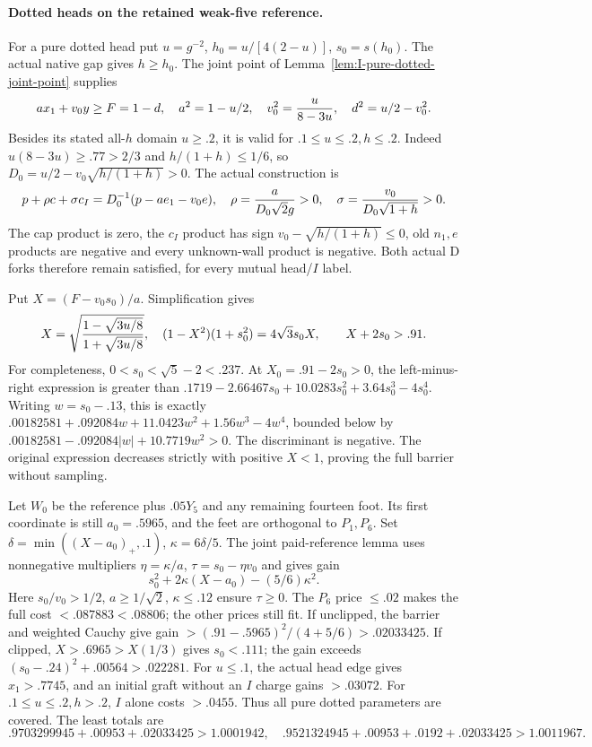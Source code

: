 \documentclass[11pt]{article}
\theoremstyle{definition}
\theoremstyle{remark}
\begin{document}
\paragraph{Dotted heads on the retained weak-five reference.}
For a pure dotted head put \(u=g^{-2}\), \(h_0=u/[4(2-u)]\),
\(s_0=s(h_0)\). The actual native gap gives \(h\ge h_0\). The
joint point of Lemma~\ref{lem:I-pure-dotted-joint-point} supplies
\[
 ax_1+v_0y\ge F=1-d,\quad a^2=1-u/2,\quad
 v_0^2={u\over8-3u},\quad d^2=u/2-v_0^2.
\]
Besides its stated all-\(h\) domain \(u\ge.2\), it is valid for
\(.1\le u\le.2,h\le.2\). Indeed \(u(8-3u)\ge.77>2/3\)
and \(h/(1+h)\le1/6\), so
\(D_0=u/2-v_0\sqrt{h/(1+h)}>0\). The actual construction is
\[
 p+\rho c+\sigma c_I=D_0^{-1}(p-ae_1-v_0e),\quad
 \rho={a\over D_0\sqrt2g}>0,\quad
 \sigma={v_0\over D_0\sqrt{1+h}}>0.
\]
The cap product is zero, the \(c_I\) product has sign
\(v_0-\sqrt{h/(1+h)}\le0\), old \(n_1,e\) products are negative
and every unknown-wall product is negative. Both actual D forks
therefore remain satisfied, for every mutual head/\(I\) label.

Put \(X=(F-v_0s_0)/a\). Simplification gives
\[
 X=\sqrt{{1-\sqrt{3u/8}\over1+\sqrt{3u/8}}},\quad
 (1-X^2)(1+s_0^2)=4\sqrt3s_0X,\qquad X+2s_0>.91.
\]
For completeness, \(0<s_0<\sqrt5-2<.237\). At
\(X_0=.91-2s_0>0\), the left-minus-right expression is greater than
\(.1719-2.66467s_0+10.0283s_0^2+3.64s_0^3-4s_0^4\).
Writing \(w=s_0-.13\), this is exactly
\(.00182581+.092084w+11.0423w^2+1.56w^3-4w^4\), bounded below
by \(.00182581-.092084|w|+10.7719w^2>0\). The discriminant
is negative. The original expression decreases strictly with
positive \(X<1\), proving the full barrier without sampling.

Let \(W_0\) be the reference plus \(.05Y_5\) and any remaining
fourteen foot. Its first coordinate is still \(a_0=.5965\), and
the feet are orthogonal to \(P_1,P_6\). Set
\(\delta=\min((X-a_0)_+,.1)\), \(\kappa=6\delta/5\).
The joint paid-reference lemma uses nonnegative multipliers
\(\eta=\kappa/a\), \(\tau=s_0-\eta v_0\) and gives gain
\[
 s_0^2+2\kappa(X-a_0)-(5/6)\kappa^2.
\]
Here \(s_0/v_0>1/2\), \(a\ge1/\sqrt2\), \(\kappa\le.12\)
ensure \(\tau\ge0\). The \(P_6\) price \(\le.02\) makes the
full cost \(<.087883<.08806\); the other prices still fit.
If unclipped, the barrier and weighted Cauchy give gain
\(>(.91-.5965)^2/(4+5/6)>.02033425\). If clipped,
\(X>.6965>X(1/3)\) gives \(s_0<.111\); the gain exceeds
\((s_0-.24)^2+.00564>.022281\).
For \(u\le.1\), the actual head edge gives \(x_1>.7745\),
and an initial graft without an \(I\) charge gains \(>.03072\).
For \(.1\le u\le.2,h>.2\), \(I\) alone costs \(>.0455\).
Thus all pure dotted parameters are covered. The least totals are
\[
 .9703299945+.00953+.02033425>1.0001942,\quad
 .9521324945+.00953+.0192+.02033425>1.0011967.
\]
\end{document}
